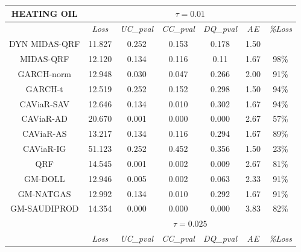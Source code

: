 \begin{table}[H]
\renewcommand{\arraystretch}{0.7}
\centering
\begin{tabular}{ccccccc}
\hline
\textbf{HEATING OIL} & \multicolumn{6}{c}{$\tau=0.01$}                         \\ \hline
                               & \textit{Loss}   & \textit{UC\_pval} & \textit{CC\_pval} & \textit{DQ\_pval }& \textit{AE }  & \textit{\%Loss}\\ \hline
\rowcolor[HTML]{D9D9D9} 
DYN MIDAS-QRF                        & 11.827 & 0.252    & 0.153    & 0.178    & 1.50 &        \\
\rowcolor[HTML]{D9D9D9} 
MIDAS-QRF                            & 12.120 & 0.134    & 0.116    & 0.11     & 1.67 & 98\%   \\
\rowcolor[HTML]{D9D9D9} GARCH-norm                     & 12.948 & 0.030    & 0.047    & 0.266    & 2.00 & 91\%   \\
\rowcolor[HTML]{D9D9D9} 
GARCH-t                        & 12.519 & 0.252    & 0.152    & 0.298    & 1.50 & 94\%   \\
\rowcolor[HTML]{D9D9D9} CAViaR-SAV                     & 12.646 & 0.134    & 0.010    & 0.302    & 1.67 & 94\%   \\
CAViaR-AD                      & 20.670 & 0.001    & 0.000    & 0.000    & 2.67 & 57\%   \\
\rowcolor[HTML]{D9D9D9} 
CAViaR-AS                      & 13.217 & 0.134    & 0.116    & 0.294    & 1.67 & 89\%   \\
\rowcolor[HTML]{D9D9D9} 
CAViaR-IG                      & 51.123 & 0.252    & 0.452    & 0.356    & 1.50 & 23\%   \\
QRF                            & 14.545 & 0.001    & 0.002    & 0.009    & 2.67 & 81\%   \\
GM-DOLL                        & 12.946 & 0.005    & 0.002    & 0.063    & 2.33 & 91\%   \\
\rowcolor[HTML]{D9D9D9} GM-NATGAS                      & 12.992 & 0.134    & 0.010    & 0.292    & 1.67 & 91\%   \\
GM-SAUDIPROD                  & 14.354 & 0.000    & 0.000    & 0.000    & 3.83 & 82\%   \\ \hline
                               & \multicolumn{6}{c}{$\tau=0.025$}                        \\ \hline
                               & \textit{Loss}   & \textit{UC\_pval} & \textit{CC\_pval} & \textit{DQ\_pval }& \textit{AE }  & \textit{\%Loss}\\ \hline

\end{tabular}
\end{table}
